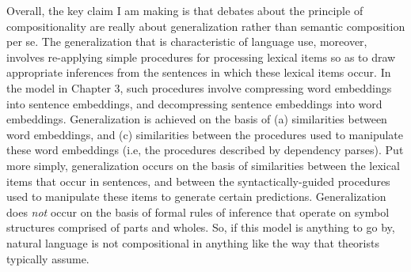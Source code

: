 Overall, the key claim I am making is that debates about the principle of compositionality are really about generalization rather than semantic composition per se. The generalization that is characteristic of language use, moreover, involves re-applying simple procedures for processing lexical items so as to draw appropriate inferences from the sentences in which these lexical items occur. In the model in Chapter 3, such procedures involve compressing word embeddings into sentence embeddings, and decompressing sentence embeddings into word embeddings. Generalization is achieved on the basis of (a) similarities between word embeddings, and (c) similarities between the procedures used to manipulate these word embeddings (i.e, the procedures described by dependency parses). Put more simply, generalization occurs on the basis of similarities between the lexical items that occur in sentences, and between the syntactically-guided procedures used to manipulate these items to generate certain predictions. Generalization does \textit{not} occur on the basis of formal rules of inference that operate on symbol structures comprised of parts and wholes. So, if this model is anything to go by, natural language is not compositional in anything like the way that theorists typically assume. 